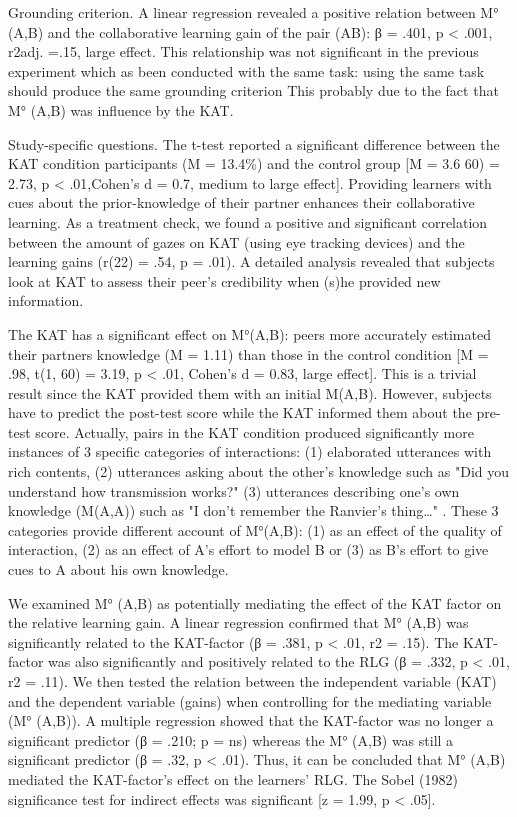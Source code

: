 \documentclass[twocolumn]{article}
\begin{document}
Grounding criterion. A linear regression revealed a positive relation between M°
(A,B) and the collaborative learning gain of the pair (AB): β = .401, p < .001,
r2adj. =.15, large effect. This relationship was not significant in the previous
experiment which as been conducted with the same task: using the same task
should produce the same grounding criterion This probably due to the fact that
M° (A,B) was influence by the KAT.

Study-specific questions. The t-test reported a significant difference between
the KAT condition participants (M = 13.4\%) and the control group [M = 3.6%
60) = 2.73, p < .01,Cohen’s d = 0.7, medium to large effect]. Providing learners
with cues about the prior-knowledge of their partner enhances their
collaborative learning. As a treatment check, we found a positive and
significant correlation between the amount of gazes on KAT (using eye tracking
devices) and the learning gains (r(22) = .54, p = .01). A detailed analysis
revealed that subjects look at KAT to assess their peer's credibility when (s)he
provided new information. 

The KAT has a significant effect on M°(A,B): peers more accurately estimated
their partners knowledge (M = 1.11) than those in the control condition [M =
.98, t(1, 60) = 3.19, p < .01, Cohen’s d = 0.83, large effect]. This is a
trivial result since the KAT provided them with an initial M(A,B). However,
subjects have to predict the post-test score while the KAT informed them about
the pre-test score. Actually, pairs in the KAT condition produced significantly
more instances of 3 specific categories of interactions: (1) elaborated
utterances with rich contents,  (2) utterances asking about the other's
knowledge such as "Did you understand how transmission works?" (3) utterances
describing one's own knowledge (M(A,A)) such as "I don’t remember the Ranvier’s
thing…" . These 3 categories provide different account of M°(A,B): (1) as an
effect of the quality of interaction, (2) as an effect of A's effort to model B
or (3) as B's effort to give cues to A about his own knowledge.

We examined M° (A,B) as potentially mediating the effect of the KAT factor on
the relative learning gain. A linear regression confirmed that M° (A,B) was
significantly related to the KAT-factor (β = .381, p < .01, r2 = .15). The
KAT-factor was also significantly and positively related to the RLG (β = .332, p
< .01, r2 = .11). We then tested the relation between the independent variable
(KAT) and the dependent variable (gains) when controlling for the mediating
variable (M° (A,B)). A multiple regression showed that the KAT-factor was no
longer a significant predictor (β = .210; p = ns) whereas the M° (A,B) was still
a significant predictor (β = .32, p < .01). Thus, it can be concluded that M°
(A,B) mediated the KAT-factor’s effect on the learners’ RLG. The Sobel (1982)
significance test for indirect effects was significant [z = 1.99, p < .05]. 
\end{document}
